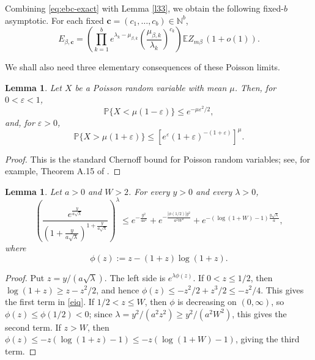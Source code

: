 \documentclass[11pt]{amsart}
\theoremstyle{plain}
\newtheorem{lemma}[theorem]{Lemma}
\numberwithin{equation}{section}
\numberwithin{theorem}{section}
\numberwithin{figure}{section}
\begin{document}
Combining \eqref{eq:ebc-exact} with Lemma \ref{l33}, we obtain the following
fixed-\(b\) asymptotic.  For each fixed
\(\mathbf c=(c_1,\ldots,c_b)\in\mathbb N^b\),
\begin{equation}\label{ebc}
  E_{\beta,\mathbf c}
  =\left(\prod_{k=1}^b
      e^{\lambda_k-\mu_{\beta,k}}
      \left(\frac{\mu_{\beta,k}}{\lambda_k}\right)^{c_k}\right)
    \mathbb E Z_{m\beta}\,(1+o(1)).
\end{equation}

We shall also need three elementary consequences of these Poisson limits.

\begin{lemma}\label{lmp}
Let \(X\) be a Poisson random variable with mean \(\mu\).  Then, for
\(0<\varepsilon<1\),
\[
  \mathbb P\{X<\mu(1-\varepsilon)\}\le e^{-\mu\varepsilon^2/2},
\]
and, for \(\varepsilon>0\),
\[
  \mathbb P\{X>\mu(1+\varepsilon)\}
  \le \left[e^\varepsilon(1+\varepsilon)^{-(1+\varepsilon)}\right]^\mu .
\]
\end{lemma}

\begin{proof}
This is the standard Chernoff bound for Poisson random variables; see, for
example, Theorem A.15 of \cite{as92}.
\end{proof}

\begin{lemma}\label{lem:poisson-upper-tail-uniform}
Let \(a>0\) and \(W>2\).  For every \(y>0\) and every \(\lambda>0\),
\begin{equation}\label{eiq}
\left(\frac{e^{\frac{y}{a\sqrt\lambda}}}
{\left(1+\frac{y}{a\sqrt\lambda}\right)^{1+\frac{y}{a\sqrt\lambda}}}
\right)^\lambda
\le
 e^{-\frac{y^2}{4a^2}}
 +e^{-\frac{|\phi(1/2)|y^2}{a^2W^2}}
 +e^{-(\log(1+W)-1)\frac{y\sqrt\lambda}{a}},
\end{equation}
where
\[
  \phi(z):=z-(1+z)\log(1+z).
\]
\end{lemma}

\begin{proof}
Put \(z=y/(a\sqrt\lambda)\).  The left side is \(e^{\lambda\phi(z)}\).
If \(0<z\le1/2\), then
\(\log(1+z)\ge z-z^2/2\), and hence
\(\phi(z)\le -z^2/2+z^3/2\le -z^2/4\).  This gives the first term in
\eqref{eiq}.  If \(1/2<z\le W\), then \(\phi\) is decreasing on \((0,\infty)\), so
\(\phi(z)\le\phi(1/2)<0\); since \(\lambda=y^2/(a^2z^2)\ge y^2/(a^2W^2)\), this
gives the second term.  If \(z>W\), then
\(\phi(z)\le -z(\log(1+z)-1)\le -z(\log(1+W)-1)\), giving the third term.
\end{proof}
\end{document}
